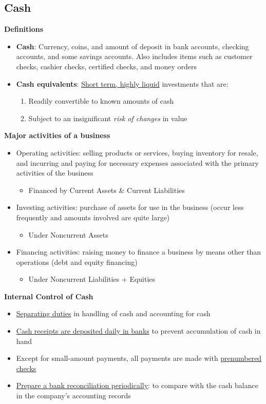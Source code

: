 \documentclass{article}
\begin{document}
\begin{multicols}{2}
\section{Cash}
\textbf{Definitions}
\begin{itemize}
	\item \textbf{Cash}: Currency, coins, and amount of deposit in bank accounts, checking accounts, and some savings accounts. Also includes items such as customer checks, cashier checks, certified checks, and money orders
	\item \textbf{Cash equivalents}: \underline{Short term, highly liquid} investments that are:
	\begin{enumerate}
		\item Readily convertible to known amounts of cash
		\item Subject to an insignificant \textit{risk of changes} in value
	\end{enumerate}
\end{itemize}
\textbf{Major activities of a business}
\begin{itemize}
	\item Operating activities: selling products or services, buying inventory for resale, and incurring and paying for necessary expenses associated with the primary activities of the business
	\begin{itemize}
		\item Financed by Current Assets \& Current Liabilities
	\end{itemize}
	\item Investing activities: purchase of assets for use in the business (occur less frequently and amounts involved are quite large)
	\begin{itemize}
		\item Under Noncurrent Assets
	\end{itemize}
	\item Financing activities: raising money to finance a business by means other than operations (debt and equity financing)
	\begin{itemize}
		\item Under Noncurrent Liabilities + Equities
	\end{itemize}
\end{itemize}
\textbf{Internal Control of Cash}
\begin{itemize}
	\item \underline{Separating duties} in handling of cash and accounting for cash
	\item \underline{Cash receipts are deposited daily in banks} to prevent accumulation of cash in hand
	\item Except for small-amount payments, all payments are made with \underline{prenumbered checks}
	\item \underline{Prepare a bank reconciliation periodically}: to compare with the cash balance in the company's accounting records
\end{itemize}


\end{multicols}
\end{document}
